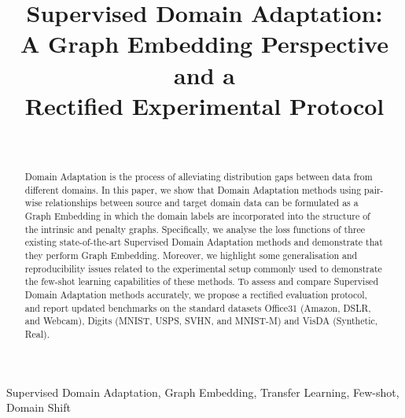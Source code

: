 \documentclass[journal]{IEEEtran}
\begin{document}
\title{Supervised Domain Adaptation:\\A Graph Embedding Perspective and a\\Rectified Experimental Protocol}




\author{
    \\
}





\maketitle



\begin{abstract}
Domain Adaptation is the process of alleviating distribution gaps between data from different domains.
In this paper, we show that Domain Adaptation methods using pair-wise relationships between source and target domain data can be formulated as a Graph Embedding in which the domain labels are incorporated into the structure of the intrinsic and penalty graphs.
Specifically, we analyse the loss functions of three existing state-of-the-art Supervised Domain Adaptation methods and demonstrate that they perform Graph Embedding. 
Moreover, we highlight some generalisation and reproducibility issues related to the experimental setup commonly used to demonstrate the few-shot learning capabilities of these methods. To assess and compare Supervised Domain Adaptation methods accurately, we propose a rectified evaluation protocol, and report updated benchmarks on the standard datasets Office31 (Amazon, DSLR, and Webcam), Digits (MNIST, USPS, SVHN, and MNIST-M) and VisDA (Synthetic, Real).
\end{abstract}

\begin{IEEEkeywords}
Supervised Domain Adaptation, Graph Embedding, Transfer Learning, Few-shot, Domain Shift
\end{IEEEkeywords}
\end{document}
